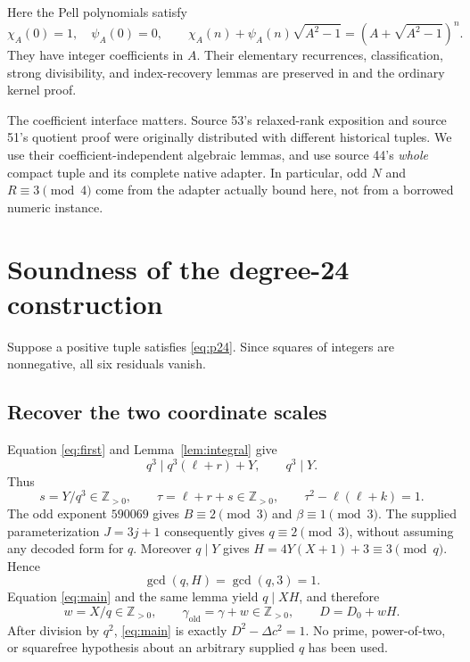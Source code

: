 \documentclass[11pt,a4paper]{article}
\theoremstyle{remark}
\newcommand{\Zp}{\mathbb Z_{>0}}
\newcommand{\ord}{\mathrm{old}}
\begin{document}
Here the Pell polynomials satisfy
\[
 \chi_A(0)=1,\quad\psi_A(0)=0,\qquad
 \chi_A(n)+\psi_A(n)\sqrt{A^2-1}
       =(A+\sqrt{A^2-1})^n.
\]
They have integer coefficients in $A$. Their elementary recurrences,
classification, strong divisibility, and index-recovery lemmas are
preserved in  and the ordinary kernel proof.

The coefficient interface matters. Source 53's relaxed-rank exposition
and source 51's quotient proof were originally distributed with different
historical tuples. We use their coefficient-independent algebraic lemmas,
and use source 44's \emph{whole} compact tuple and its complete native
adapter. In particular, odd $N$ and $R\equiv3\pmod4$ come from the adapter
actually bound here, not from a borrowed numeric instance.

\section{Soundness of the degree-24 construction}
\label{sec:soundness}

Suppose a positive tuple satisfies \eqref{eq:p24}. Since squares of integers
are nonnegative, all six residuals vanish.

\subsection{Recover the two coordinate scales}

Equation \eqref{eq:first} and Lemma~\ref{lem:integral} give
\[
 q^3\mid q^3(\ell+r)+Y,\qquad q^3\mid Y.
\]
Thus
\begin{equation}
 s=Y/q^3\in\Zp,\qquad \tau=\ell+r+s\in\Zp,
 \qquad \tau^2-\ell(\ell+k)=1.
 \label{eq:restorefirst}
\end{equation}
The odd exponent $590069$ gives $B\equiv2\pmod3$ and
$\beta\equiv1\pmod3$. The supplied parameterization $J=3j+1$ consequently
gives $q\equiv2\pmod3$, without assuming any decoded form for $q$.
Moreover $q\mid Y$ gives $H=4Y(X+1)+3\equiv3\pmod q$. Hence
\[
 \gcd(q,H)=\gcd(q,3)=1.
\]
Equation \eqref{eq:main} and the same lemma yield $q\mid XH$, and therefore
\begin{equation}
 w=X/q\in\Zp,\qquad
 \gamma_{\ord}=\gamma+w\in\Zp,
 \qquad D=D_0+wH.
 \label{eq:restoremain}
\end{equation}
After division by $q^2$, \eqref{eq:main} is exactly
$D^2-\Delta c^2=1$. No prime, power-of-two, or squarefree hypothesis about
an arbitrary supplied $q$ has been used.
\end{document}
